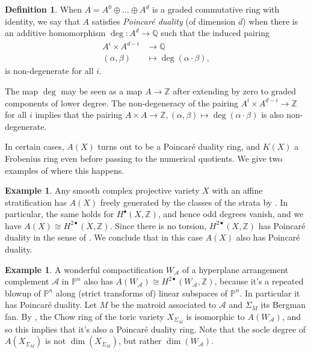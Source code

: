 \documentclass[oneside]{amsart}
\theoremstyle{plain}
\theoremstyle{definition}
\newtheorem{definition}[theorem]{Definition}
\newtheorem{example}[theorem]{Example}
\newcommand{\Z}{{\mathbb{Z}}}
\newcommand{\p}{{\mathbb{P}}}
\newcommand{\Q}{{\mathbb{Q}}}
\newcommand{\cA}{{\mathcal{A}}}
\begin{document}
\begin{definition}\label{def:poincare-duality}
    When $A = A^0 \oplus \dots \oplus A^d$ is a graded commutative ring
    with identity, we say that $A$ satisfies \emph{Poincar\'e duality} (of dimension $d$)
    when there is an additive homomorphism $\deg: A^d \to \Q$ such that the induced pairing
    \begin{align*}
    A^i \times A^{d-i} &\to \Q\\
    (\alpha, \beta) &\mapsto \deg(\alpha \cdot \beta),
    \end{align*}
    is non-degenerate for all $i$.
\end{definition}

The map $\deg$ may be seen as a map $A \to \Z$ after extending by zero to graded components of lower degree.
The non-degeneracy of the pairing $A^i \times A^{d-i} \to \Z$ for all $i$ implies that the pairing $A \times A \to \Z, (\alpha, \beta) \mapsto \deg(\alpha \cdot \beta)$ is also non-degenerate. 

In certain cases, $A(X)$ turns out to be a Poincar\'e duality ring, and $K(X)$ a Frobenius ring even before passing to the numerical quotients. We give two examples of where this happens.

\begin{example}
    Any smooth complex projective variety $X$ with an affine stratification has $A(X)$ freely generated by the classes of the strata by \cite{totaro14}. In particular, the same holds for $H^{\bullet}(X, \Z)$, and hence odd degrees vanish, and we have $A(X) \cong H^{2\bullet}(X, \Z)$. Since there is no torsion, $H^{2\bullet}(X, \Z)$ has Poincar\'e duality in the sense of . We conclude that in this case $A(X)$ also has Poincar\'e duality.
\end{example}


\begin{example}
    A wonderful compactification $W_\cA$ of a hyperplane arrangement complement $\cA$ in $\p^n$ also has $A(W_\cA) \cong H^{2\bullet}(W_\cA, \Z)$, because it's a repeated blowup of $\p^n$ along (strict transforms of) linear subspaces of $\p^n$. In particular it has Poincar\'e duality.
    Let $M$ be the matroid associated to $\cA$ and $\Sigma_M$ its Bergman fan.
    By \cite[Theorem 3]{FY04}, the Chow ring of the toric variety $X_{\Sigma_M}$ is isomorphic to $A(W_\cA)$, and so this implies that it's also a Poincar\'e duality ring.
    Note that the socle degree of $A(X_{\Sigma_M})$ is not $\dim(X_{\Sigma_M})$, but rather $\dim(W_\cA)$.
\end{example}
\end{document}
